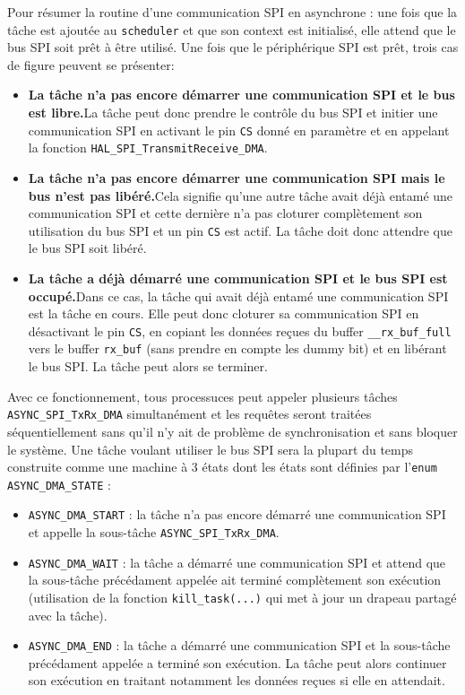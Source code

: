Pour résumer la routine d'une communication SPI en asynchrone : une fois que la
tâche est ajoutée au \texttt{scheduler} et que son context est initialisé, elle
attend que le bus SPI soit prêt à être utilisé. Une fois que le périphérique SPI
est prêt, trois cas de figure peuvent se présenter:
\begin{itemize}
    \item \textbf{La tâche n'a pas encore démarrer une communication SPI et le bus
    est libre.}\newline     La tâche peut donc prendre le contrôle du bus SPI et
    initier une communication SPI en activant le pin \texttt{CS} donné en paramètre
    et en appelant la fonction \texttt{HAL\_SPI\_TransmitReceive\_DMA}.
    \item \textbf{La tâche n'a pas encore démarrer une communication SPI mais le
    bus n'est pas libéré.}\newline Cela signifie qu'une autre tâche avait déjà
    entamé une communication SPI et cette dernière n'a pas cloturer complètement
    son utilisation du bus SPI et un pin \texttt{CS} est actif. La tâche doit donc
    attendre que le bus SPI soit libéré.
    \item \textbf{La tâche a déjà démarré une communication SPI et le bus SPI est
    occupé.}\newline Dans ce cas, la tâche qui avait déjà entamé une communication
    SPI est la tâche en cours. Elle peut donc cloturer sa communication SPI en
    désactivant le pin \texttt{CS}, en copiant les données reçues du buffer
    \texttt{\_\_rx\_buf\_full} vers le buffer \texttt{rx\_buf} (sans prendre en
    compte les dummy bit) et en libérant le bus SPI. La tâche peut alors se terminer.\\
\end{itemize}

\newpage

Avec ce fonctionnement, tous processuces peut appeler plusieurs tâches
\texttt{ASYNC\_SPI\_TxRx\_DMA} simultanément et les requêtes seront traitées
séquentiellement sans qu'il n'y ait de problème de synchronisation et sans bloquer
le système. Une tâche voulant utiliser le bus SPI sera la plupart du temps
construite comme une machine à 3 états dont les états sont définies par
l'\texttt{enum} \texttt{ASYNC\_DMA\_STATE} :
\begin{itemize}
    \item \texttt{ASYNC\_DMA\_START} : la tâche n'a pas encore démarré une
    communication SPI et appelle la sous-tâche \texttt{ASYNC\_SPI\_TxRx\_DMA}.
    \item \texttt{ASYNC\_DMA\_WAIT} : la tâche a démarré une communication SPI et
    attend que la sous-tâche précédament appelée ait terminé complètement son
    exécution (utilisation de la fonction \texttt{kill\_task(...)} qui met à jour
    un drapeau partagé avec la tâche).
    \item \texttt{ASYNC\_DMA\_END} : la tâche a démarré une communication SPI et
    la sous-tâche précédament appelée a terminé son exécution. La tâche peut alors
    continuer son exécution en traitant notamment les données reçues si elle en
    attendait.    
\end{itemize}

